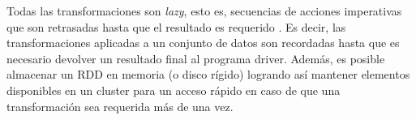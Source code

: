 \bigskip Todas las transformaciones son \textit{lazy}, esto es, secuencias de acciones imperativas que son retrasadas hasta que el resultado es requerido \citep{launchbury1993lazy}. Es decir, las transformaciones aplicadas a un conjunto de datos son recordadas hasta que es necesario devolver un resultado final al programa driver. Además, es posible almacenar un RDD en memoria (o disco rígido) logrando así mantener elementos disponibles en un cluster para un acceso rápido en caso de que una transformación sea requerida más de una vez.